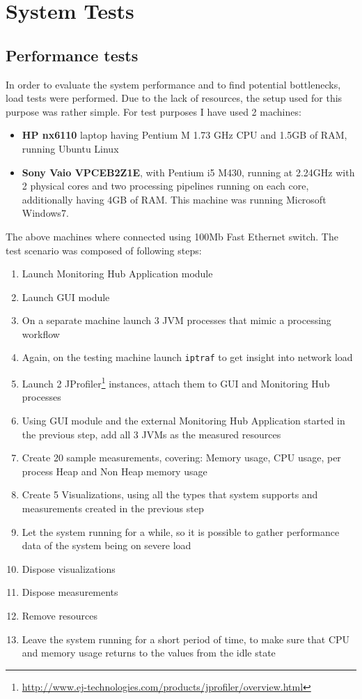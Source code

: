 %
\section{System Tests}
\label{sec:tests}
\subsection{Performance tests}

In order to evaluate the system performance and to find potential bottlenecks, load tests were performed. Due to the lack of resources, the setup used for this purpose was rather simple. For test purposes I have used 2 machines: 

\begin{itemize}
\item {\bf HP nx6110} laptop having Pentium M 1.73 GHz CPU and 1.5GB of RAM, running Ubuntu Linux
\item {\bf Sony Vaio VPCEB2Z1E}, with Pentium i5 M430, running at 2.24GHz with 2 physical cores and two processing pipelines running on each core, additionally having 4GB of RAM. This machine was running Microsoft Windows7.
\end{itemize}
The above machines where connected using 100Mb Fast Ethernet switch. The test scenario was composed of following steps:

\begin{enumerate}
\item Launch Monitoring Hub Application module
\item Launch GUI module
\item On a separate machine launch 3 JVM processes that mimic a processing workflow
\item Again, on the testing machine launch \texttt{iptraf} to get insight into network load
\item Launch 2 JProfiler\footnote{\url{http://www.ej-technologies.com/products/jprofiler/overview.html}} instances, attach them to GUI and Monitoring Hub processes
\item Using GUI module and the external Monitoring Hub Application started in the previous step, add all 3 JVMs as the measured resources
\item Create 20 sample measurements, covering: Memory usage, CPU usage, per process Heap and Non Heap memory usage
\item Create 5 Visualizations, using all the types that system supports and measurements created in the previous step
\item Let the system running for a while, so it is possible to gather performance data of the system being on severe load
\item Dispose visualizations
\item Dispose measurements
\item Remove resources
\item Leave the system running for a short period of time, to make sure that CPU and memory usage returns to the values from the idle state
\end{enumerate}

